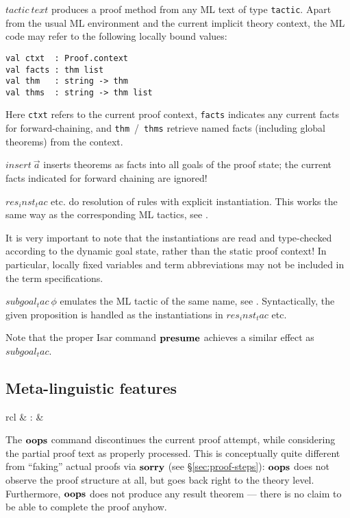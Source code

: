 \begin{descr}
\item [$tactic~text$] produces a proof method from any ML text of type
  \texttt{tactic}.  Apart from the usual ML environment and the current
  implicit theory context, the ML code may refer to the following locally
  bound values:

{\footnotesize\begin{verbatim}
val ctxt  : Proof.context
val facts : thm list
val thm   : string -> thm
val thms  : string -> thm list
\end{verbatim}}
  Here \texttt{ctxt} refers to the current proof context, \texttt{facts}
  indicates any current facts for forward-chaining, and
  \texttt{thm}~/~\texttt{thms} retrieve named facts (including global
  theorems) from the context.
\item [$insert~\vec a$] inserts theorems as facts into all goals of the proof
  state; the current facts indicated for forward chaining are ignored!
\item [$res_inst_tac$ etc.] do resolution of rules with explicit
  instantiation.  This works the same way as the corresponding ML tactics, see
  \cite[\S3]{isabelle-ref}.
  
  It is very important to note that the instantiations are read and
  type-checked according to the dynamic goal state, rather than the static
  proof context!  In particular, locally fixed variables and term
  abbreviations may not be included in the term specifications.
\item [$subgoal_tac~\phi$] emulates the ML tactic of the same name, see
  \cite[\S3]{isabelle-ref}.  Syntactically, the given proposition is handled
  as the instantiations in $res_inst_tac$ etc.
  
  Note that the proper Isar command ${\mathord{\mathbf{presume}}}$ achieves a similar effect
  as $subgoal_tac$.
\end{descr}


\subsection{Meta-linguistic features}

\begin{matharray}{rcl}
   & : &  \\
\end{matharray}

The ${\mathord{\mathbf{oops}}}$ command discontinues the current proof attempt, while considering
the partial proof text as properly processed.  This is conceptually quite
different from ``faking'' actual proofs via ${\mathord{\mathbf{sorry}}}$ (see
\S\ref{sec:proof-steps}): ${\mathord{\mathbf{oops}}}$ does not observe the proof structure at all,
but goes back right to the theory level.  Furthermore, ${\mathord{\mathbf{oops}}}$ does not
produce any result theorem --- there is no claim to be able to complete the
proof anyhow.

